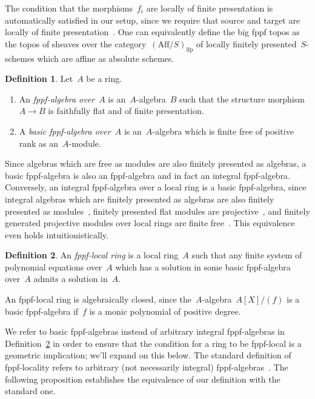 \documentclass[10pt,reqno,a4paper]{amsbook}
\theoremstyle{definition}
\newtheorem{defn}{Definition}[section]
\theoremstyle{plain}
\theoremstyle{remark}
\newcommand{\Aff}{\mathrm{Aff}}
\newcommand{\lfp}{\mathrm{lfp}}
\newcommand{\?}{\,{:}\,}
\renewcommand{\_}{\mathpunct{.}\,}
\newcommand{\stacksproject}[1]{\cite[{\href{http://stacks.math.columbia.edu/tag/#1}{Tag~#1}}]{stacks-project}}
\begin{document}
The condition that the morphisms~$f_i$ are locally of finite presentation is
automatically satisfied in our setup, since we require that source and target
are locally of finite presentation~\stacksproject{02FV}. One can equivalently
define the big fppf topos as the topos of sheaves over the
category~$(\Aff/S)_\lfp$ of locally finitely presented~$S$-schemes which are
affine as absolute schemes.

\begin{defn}Let~$A$ be a ring.
\begin{enumerate}
\item An \emph{fppf-algebra over~$A$} is an~$A$-algebra~$B$ such that the
structure morphism~$A \to B$ is faithfully flat and of finite presentation.
\item A \emph{basic fppf-algebra over~$A$} is an~$A$-algebra which
is finite free of positive rank as an~$A$-module.
\end{enumerate}
\end{defn}

Since algebras which are free as modules are also finitely presented as
algebras, a basic fppf-algebra is also an fppf-algebra and in fact an integral
fppf-algebra. Conversely, an integral fppf-algebra over a local ring is a basic
fppf-algebra, since integral algebras which are finitely presented as algebras
are also finitely presented as modules~\stacksproject{0564}, finitely presented
flat modules are projective~\stacksproject{058R}, and finitely generated
projective modules over local rings are finite free~\stacksproject{00NX}. This
equivalence even holds intuitionistically.

\begin{defn}\label{defn:fppf-local-ring}
An \emph{fppf-local ring} is a local ring~$A$ such that any finite system of
polynomial equations over~$A$ which has a solution in some basic fppf-algebra
over~$A$ admits a solution in~$A$.
\end{defn}

An fppf-local ring is algebraically closed, since
the~$A$-algebra~$A[X]/(f)$ is a basic fppf-algebra if~$f$ is a monic polynomial
of positive degree.

We refer to basic fppf-algebras instead of arbitrary integral fppf-algebras in
Definition~\ref{defn:fppf-local-ring} in order to ensure that the condition for
a ring to be fppf-local is a geometric implication; we'll expand on this below.
The standard definition of fppf-locality refers to arbitrary (not necessarily
integral) fppf-algebras~\cite[Definition~4.1]{schroer:points-fppf}. The
following proposition establishes the equivalence of our definition with the
standard one.
\end{document}
